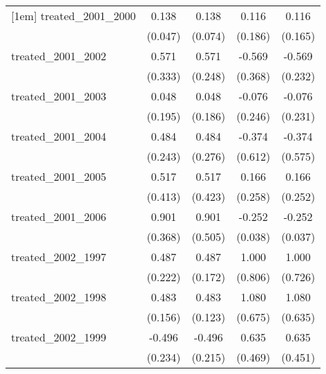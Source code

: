 {\begin{tabular}{l*{4}{c}}
[1em]
treated\_2001\_2000&       0.138\sym{**} &       0.138         &       0.116         &       0.116         \\
            &     (0.047)         &     (0.074)         &     (0.186)         &     (0.165)         \\
[1em]
treated\_2001\_2002&       0.571         &       0.571\sym{*}  &      -0.569         &      -0.569\sym{*}  \\
            &     (0.333)         &     (0.248)         &     (0.368)         &     (0.232)         \\
[1em]
treated\_2001\_2003&       0.048         &       0.048         &      -0.076         &      -0.076         \\
            &     (0.195)         &     (0.186)         &     (0.246)         &     (0.231)         \\
[1em]
treated\_2001\_2004&       0.484\sym{*}  &       0.484         &      -0.374         &      -0.374         \\
            &     (0.243)         &     (0.276)         &     (0.612)         &     (0.575)         \\
[1em]
treated\_2001\_2005&       0.517         &       0.517         &       0.166         &       0.166         \\
            &     (0.413)         &     (0.423)         &     (0.258)         &     (0.252)         \\
[1em]
treated\_2001\_2006&       0.901\sym{*}  &       0.901         &      -0.252\sym{***}&      -0.252\sym{***}\\
            &     (0.368)         &     (0.505)         &     (0.038)         &     (0.037)         \\
[1em]
treated\_2002\_1997&       0.487\sym{*}  &       0.487\sym{**} &       1.000         &       1.000         \\
            &     (0.222)         &     (0.172)         &     (0.806)         &     (0.726)         \\
[1em]
treated\_2002\_1998&       0.483\sym{**} &       0.483\sym{***}&       1.080         &       1.080         \\
            &     (0.156)         &     (0.123)         &     (0.675)         &     (0.635)         \\
[1em]
treated\_2002\_1999&      -0.496\sym{*}  &      -0.496\sym{*}  &       0.635         &       0.635         \\
            &     (0.234)         &     (0.215)         &     (0.469)         &     (0.451)         \\

\end{tabular}}
